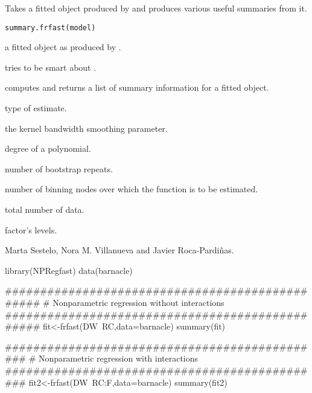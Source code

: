 %
\begin{Description}\relax
Takes a fitted  object produced by  and produces various useful
summaries from it.
\end{Description}
%
\begin{Usage}
\begin{verbatim}
summary.frfast(model)
\end{verbatim}
\end{Usage}
%
\begin{Arguments}
\begin{ldescription}
\item[\code{model}] a fitted  object as produced by .
\end{ldescription}
\end{Arguments}
%
\begin{Details}\relax
{} tries to be smart about .
\end{Details}
%
\begin{Value}
 computes and returns a list of summary information for a fitted  object.

\begin{ldescription}
\item[\code{model}] type of estimate.
\item[\code{h}] the kernel bandwidth smoothing parameter.
\item[\code{dp}] degree of a polynomial.
\item[\code{nboot}] number of bootstrap repeats.
\item[\code{kbin}] number of binning nodes over which the function is to be estimated.
\item[\code{n}] total number of data.
\item[\code{fmod}] factor's levels.

\end{ldescription}
\end{Value}
%
\begin{Author}\relax
Marta Sestelo, Nora M. Villanueva and Javier Roca-Pardiñas.
\end{Author}
%
\begin{Examples}
\begin{ExampleCode}
library(NPRegfast)
data(barnacle)


################################################
# Nonparametric regression without interactions
################################################
fit<-frfast(DW~RC,data=barnacle)
summary(fit)

##############################################
# Nonparametric regression with interactions
##############################################
fit2<-frfast(DW~RC:F,data=barnacle)
summary(fit2)
\end{ExampleCode}
\end{Examples}
